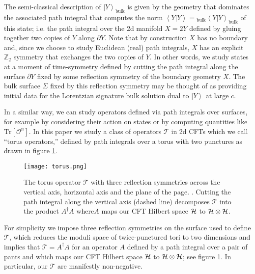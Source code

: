 \documentclass[letterpaper,12pt]{article}
\def\DM#1{{\color{red}{ [#1]}}}
\newcommand{\corr}[1]{\left< #1\right>}
\newcommand{\Tr}{\text{Tr}}
\newcommand{\ket}[1]{\left| #1\right>}
\begin{document}
The semi-classical description of $\ket {Y}_\text{bulk}$ is given by the geometry that dominates the associated path integral that computes the norm $\corr{{Y}|{Y}} = {}_\text{bulk}\corr{{Y}|{Y}}_\text{bulk}$ of this state; i.e. the path integral over the 2d manifold $X=2Y$ defined by gluing together two copies of ${Y}$ along $\partial {Y}$. Note that by construction $X$ has no boundary and, since we choose to study Euclidean (real) path integrals, $X$ has an explicit $\mathbb Z_2$ symmetry that exchanges the two copies of ${Y}$.  In other words, we study states at a moment of time-symmetry defined by cutting the path integral along the surface $\partial {Y}$ fixed by some reflection symmetry of the boundary geometry $X$. The bulk surface $\Sigma$ fixed by this reflection symmetry may be thought of as providing initial data for the Lorentzian signature bulk solution dual to $\ket Y$ at large $c$.

In a similar way, we can study operators defined via path integrals over surfaces, for example by considering their action on states or by computing quantities like $\Tr [\mathcal O^n]$. In this paper we study a class of operators $\mathcal T$ in 2d CFTs which we call ``torus operators,'' defined by path integrals over a torus with two punctures as drawn in figure \ref{fig:operator}.
\begin{figure}[ht!]
\centering
\texttt{[image: torus.png]}
\caption{
The torus operator $\mathcal T$ with three reflection symmetries across the vertical axis, horizontal axis and the plane of the page. \label{fig:operator}.  Cutting the path integral along the vertical axis (dashed line) decomposes $\mathcal T$ into the product $A^\dagger A$ where$ A$ maps our CFT Hilbert space ${\cal H}$ to   ${\cal H} \otimes  {\cal H}$. \DM{Add dashed vertical line.}
}
\end{figure}
For simplicity we impose three reflection symmetries on the surface used to define $\mathcal T$, which reduces the moduli space of twice-punctured tori to two dimensions and implies that $\mathcal T = A^\dagger A$ for an operator $A$ defined by a path integral over a pair of pants and which maps our CFT Hilbert space ${\cal H}$ to   ${\cal H} \otimes  {\cal H}$; see figure \ref{fig:operator}.  In particular, our $\mathcal T$ are manifestly non-negative.
\end{document}
